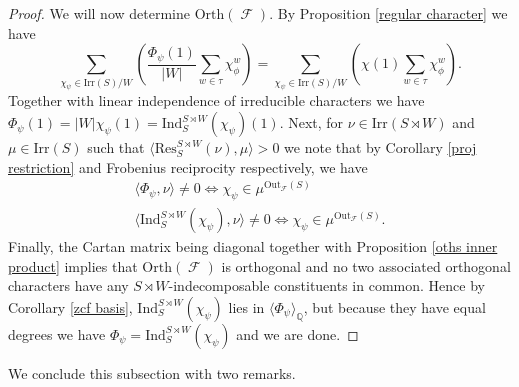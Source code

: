 \documentclass[12pt]{article}
\DeclareMathOperator{\Q}{\mathbb{Q}}
\DeclareMathOperator{\sF}{\mathcal{F}}
\theoremstyle{plain}
\theoremstyle{definition}
\begin{document}
\begin{proof}
We will now determine $\mathrm{Orth}(\sF)$. By Proposition \ref{regular character} we have 
\[\sum_{\chi_{\psi} \in \text{Irr}(S)/W} \left(\frac{\Phi_{\psi}(1)}{|W|}\sum_{w \in \tau} \chi_{\phi}^w\right) = \sum_{\chi_{\psi} \in \text{Irr}(S)/W} \left(\chi(1)\sum_{w \in \tau} \chi_{\phi}^w\right).\]
Together with linear independence of irreducible characters we have $\Phi_{\psi}(1) = |W|\chi_{\psi}(1) = \text{Ind}_S^{S \rtimes W}(\chi_{\psi})(1)$. Next, for $\nu \in \text{Irr}(S \rtimes W)$ and $\mu \in \text{Irr}(S)$ such that $\langle \mathrm{Res}^{S \rtimes W}_S(\nu), \mu \rangle > 0$ we note that by Corollary \ref{proj restriction} and Frobenius reciprocity respectively, we have
\begin{align*}
\langle \Phi_{\psi}, \nu \rangle \neq 0 \iff \chi_{\psi} \in \mu^{\mathrm{Out}_{\sF}(S)} \\
\langle \text{Ind}_S^{S \rtimes W}(\chi_{\psi}), \nu \rangle \neq 0 \iff \chi_{\psi} \in \mu^{\mathrm{Out}_{\sF}(S)}.
\end{align*}
Finally, the Cartan matrix being diagonal together with Proposition \ref{oths inner product} implies that $\mathrm{Orth}(\sF)$ is orthogonal and no two associated orthogonal characters have any $S \rtimes W$-indecomposable constituents in common. Hence by Corollary \ref{zcf basis},  $\text{Ind}_S^{S \rtimes W}(\chi_{\psi})$ lies in $\langle \Phi_{\psi} \rangle_{\Q}$, but because they have equal degrees we have $\Phi_{\psi} = \text{Ind}_S^{S \rtimes W}(\chi_{\psi})$ and we are done.
\end{proof}
We conclude this subsection with two remarks. 
\end{document}
